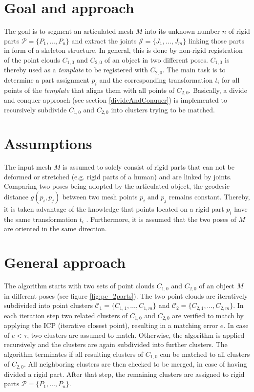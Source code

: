 \documentclass[notitlepage,english]{hgbreport}
\begin{document}
	\section{Goal and approach}
	
	The goal is to segment an articulated mesh $M$ into its unknown number $n$ of rigid parts $\mathcal{P} =  \{P_1,\ldots,P_n\}$ and extract the joints $\mathcal{J} =  \{J_1,\ldots,J_m\}$ linking those parts in form of a skeleton structure. In general, this is done by non-rigid registration of the point clouds $C_{1,0}$ and $C_{2,0}$ of an object in two different poses. $C_{1,0}$ is thereby used as a \textit{template} to be registered with $C_{2,0}$. The main task is to determine a part assignment $p_i$ and the corresponding transformation $t_i$ for all points of the \textit{template} that aligns them with all points of $C_{2,0}$. Basically, a divide and conquer approach (see section \ref{divideAndConquer}) is implemented to recursively subdivide $C_{1,0}$ and $C_{2,0}$ into clusters trying to be matched. 
	
	\section{Assumptions}
	
	The input mesh $M$ is assumed to solely consist of rigid parts that can not be deformed or stretched (e.g. rigid parts of a human) and are linked by joints. Comparing two poses being adopted by the articulated object, the geodesic distance $g(p_i,p_j)$ between two mesh points $p_i$ and $p_j$ remains constant. Thereby, it is taken advantage of the knowledge that points located on a rigid part $p_i$ have the same transformation $t_i$ . Furthermore, it is assumed that the two poses of $M$ are oriented in the same direction.
	
	\section{General approach}
	
	The algorithm starts with two sets of point clouds $C_{1,0}$ and $C_{2,0}$ of an object $M$ in different poses (see figure \ref{fig:pc_2parts}). The two point clouds are iteratively subdivided into point clusters $\mathcal{C_1} =  \{C_{1,1},\ldots, C_{1,m}\}$ and $\mathcal{C_2} =  \{C_{2,1},\ldots, C_{2,m}\}$. In each iteration step two related clusters of $C_{1,0}$ and $C_{2,0}$ are verified to match by applying the ICP (iterative closest point), resulting in a matching error $e$. In case of $ e < \tau $, two clusters are assumed to match. Otherwise, the algorithm is applied recursively and the clusters are again subdivided into further clusters. The algorithm terminates if all resulting clusters of $C_{1,0}$ can be matched to all clusters of $C_{2,0}$. All neighboring clusters are then checked to be merged, in case of having divided a rigid part. After that step, the remaining clusters are assigned to rigid parts $\mathcal{P} =  \{P_1,\ldots,P_n\}$.
	
\end{document}
